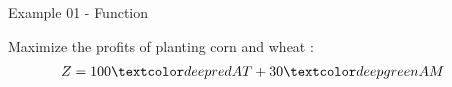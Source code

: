 \begin{frame}{Example 01 - Function}

Maximize the profits of planting corn and wheat :
\begin{align*}
    Z &= 100\colora{AT} + 30\colorb{AM}
\end{align*}

\end{frame}
